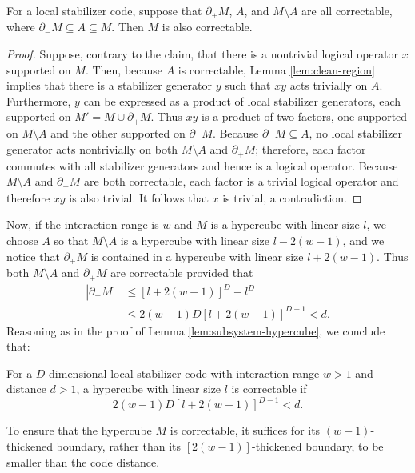 \begin{lem}
For a local stabilizer code, 
suppose that $\partial_+M$, $A$, and $M\setminus A$  are all correctable, 
where $\partial_- M \subseteq A \subseteq M$. 
Then $M$ is also correctable. 
\end{lem}
\begin{proof}
Suppose, contrary to the claim, that there is a nontrivial logical operator $x$ supported on $M$.
Then, because $A$ is correctable, Lemma \ref{lem:clean-region} implies that
there is a stabilizer generator $y$ such that $xy$ acts trivially on $A$. 
Furthermore, $y$ can be expressed as a product of local stabilizer generators, 
each supported on $M'=M\cup\partial_+M$. 
Thus $xy$ is a product of two factors, 
one supported on $M\setminus A$ and the other supported on $\partial_+M$. 
Because $\partial_-M\subseteq A$, no local stabilizer generator acts nontrivially on both $M\setminus A$ and $\partial_+M$;
therefore, each factor commutes with all stabilizer generators and hence is a logical operator.
Because $M\setminus A$ and $\partial_+M$ are both correctable, 
each factor is a trivial logical operator and therefore $xy$ is also trivial.
It follows that $x$ is trivial, a contradiction. 
\end{proof}

Now, if the interaction range is $w$ and $M$ is a hypercube with linear size $l$, 
we choose $A$ so that $M\setminus A$ is a hypercube with linear size $l-2(w-1)$, 
and we notice that $\partial_+M$ is contained in a hypercube with linear size $l+2(w-1)$. 
Thus both $M\setminus A$ and $\partial_+ M$ are correctable provided that
\begin{align*}
|\partial_+ M| &\le \left[l +2(w-1)\right]^D - l^D \nonumber\\
&\le 2(w-1)D\left[l +2(w-1)\right]^{D-1} < d.
\end{align*}
Reasoning as in the proof of Lemma \ref{lem:subsystem-hypercube}, we conclude that:

\begin{lem}
\label{lem:stabilizer-hypercube}
For a $D$-dimensional local stabilizer code with interaction range $w>1$ and distance $d>1 $, a hypercube with linear size $l$ is correctable if 
\begin{equation}\label{eq:hypercube-size-stabilizer}
2(w-1)D\left[l+ 2(w-1)\right]^{D-1} < d.
\end{equation}
\end{lem}

\noindent To ensure that the hypercube $M$ is correctable, it suffices for its $(w-1)$-thickened boundary, rather than its $\left[2(w-1)\right]$-thickened boundary, to be smaller than the code distance. 


